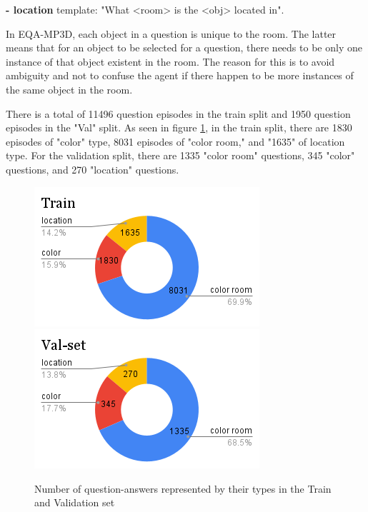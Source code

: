 \textbf{- location} template: "What <room> is the <obj> located in". 

In EQA-MP3D, each object in a question is unique to the room. The latter means that for an object to be selected for a question, there needs to be only one instance of that object existent in the room. The reason for this is to avoid ambiguity and not to confuse the agent if there happen to be more instances of the same object in the room. 

There is a total of 11496 question episodes in the train split and 1950 question episodes in the "Val" split. As seen in figure \ref{fig:questioncount}, in the train split, there are 1830 episodes of "color" type, 8031 episodes of "color room," and "1635" of location type. For the validation split, there are 1335 "color room" questions, 345 "color" questions, and 270 "location" questions. 


\begin{figure}[H]
\centering
\includegraphics[scale=0.45]{images/Train.png}
\includegraphics[scale=0.45]{images/Val-set.png}
\caption{Number of question-answers represented by their types in the Train and Validation set}
\label{fig:questioncount}
\end{figure}

